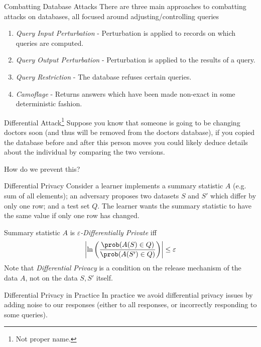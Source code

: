 \documentclass[11pt,a4paper]{article}
\begin{document}
  \begin{proposition}{Combatting Database Attacks}
    There are three main approaches to combatting attacks on databases, all focused around adjusting/controlling queries
    \begin{enumerate}
      \item \textit{Query Input Perturbation} - Perturbation is applied to records on which queries are computed.
      \item \textit{Query Output Perturbation} - Perturbation is applied to the results of a query.
      \item \textit{Query Restriction} - The database refuses certain queries.
      \item \textit{Camoflage} - Returns answers which have been made non-exact in some deterministic fashion.
    \end{enumerate}
  \end{proposition}

  \begin{remark}{Differential Attack\footnote{Not proper name.}}
    Suppose you know that someone is going to be changing doctors soon (and thus will be removed from the doctors database), if you copied the database before and after this person moves you could likely deduce details about the individual by comparing the two versions.
    \par How do we prevent this?
  \end{remark}

  \begin{definition}{Differential Privacy}
    Consider a learner implements a summary statistic $A$ (e.g. sum of all elements); an adversary proposes two datasets $S$ and $S'$ which differ by only one row; and a test set $Q$. The learner wants the summary statistic to have the same value if only one row has changed.
    \par Summary statistic $A$ is \textit{$\varepsilon$-Differentially Private} iff
    \[ \left|\ln\left(\frac{\prob(A(S)\in Q)}{\prob(A(S')\in Q)}\right)\right|\leq\varepsilon \]
    Note that \textit{Differential Privacy} is a condition on the release mechanism of the data $A$, not on the data $S,S'$ itself.
  \end{definition}

  \begin{remark}{Differential Privacy in Practice}
    In practice we avoid differential privacy issues by adding noise to our responses (either to all responses, or incorrectly responding to some queries).
  \end{remark}
\end{document}
